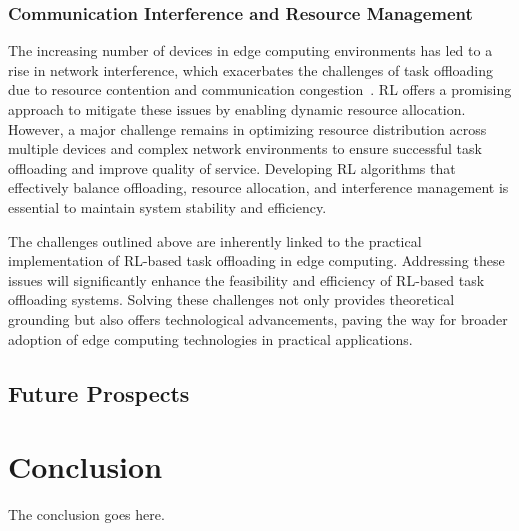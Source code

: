 \documentclass[journal]{IEEEtran}
\begin{document}
\subsubsection{Communication Interference and Resource Management}
The increasing number of devices in edge computing environments has led to a rise in network interference, which exacerbates the challenges of task offloading due to resource contention and communication congestion~\cite{zhou08}. RL offers a promising approach to mitigate these issues by enabling dynamic resource allocation. However, a major challenge remains in optimizing resource distribution across multiple devices and complex network environments to ensure successful task offloading and improve quality of service. Developing RL algorithms that effectively balance offloading, resource allocation, and interference management is essential to maintain system stability and efficiency.

The challenges outlined above are inherently linked to the practical implementation of RL-based task offloading in edge computing. Addressing these issues will significantly enhance the feasibility and efficiency of RL-based task offloading systems. Solving these challenges not only provides theoretical grounding but also offers technological advancements, paving the way for broader adoption of edge computing technologies in practical applications.

\subsection{Future Prospects}

\section{Conclusion}
The conclusion goes here.








\vfill
\end{document}
